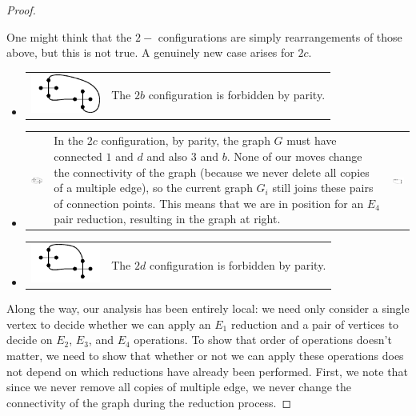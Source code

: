 \documentclass[amsmath,secnumarabic,floatfix,amssymb,nofootinbib,nobibnotes,letterpaper,11pt,tightenlines,showkeys]{revtex4}
\theoremstyle{definition}
\newcommand{\loopinsert}{E_1}
\newcommand{\edgedouble}{E_2}
\newcommand{\cutedgedouble}{E_3}
\newcommand{\pairinsert}{E_4}
\begin{document}
\begin{proof}
\begin{itemize}
\end{itemize}
One might think that the $2-$ configurations are simply rearrangements of those above, but this is not true. A genuinely new case arises for $2c$.
\begin{itemize}
\item 
\begin{tabular}{m{1in}m{3in}}
\includegraphics[width=0.9in]{2-b-configuration}
&
The $2b$ configuration is forbidden by parity.
\end{tabular}
\item 
\begin{tabular}{m{1in}m{3in}m{1in}}
\includegraphics[width=1in]{2-c-configuration}
&
In the $2c$ configuration, by parity, the graph $G$ must have connected $1$ and $d$ and also $3$ and $b$. None of our moves change the connectivity of the graph (because we never delete all copies of a multiple edge), so the current graph $G_i$ still joins these pairs of connection points. This means that we are in position for an $\pairinsert$ pair reduction, resulting in the graph at right.
&
\includegraphics[width=1in]{2-c-target}
\end{tabular}
\item 
\begin{tabular}{m{1in}m{3in}}
\includegraphics[width=0.9in]{2-d-configuration}
&
The $2d$ configuration is forbidden by parity.
\end{tabular}
\end{itemize}
Along the way, our analysis has been entirely local: we need only consider a single vertex to decide whether we can apply an $\loopinsert$ reduction and a pair of vertices to decide on $\edgedouble$, $\cutedgedouble$, and $\pairinsert$ operations. To show that order of operations doesn't matter, we need to show that whether or not we can apply these operations does not depend on which reductions have already been performed. First, we note that since we never remove all copies of multiple edge, we never change the connectivity of the graph during the reduction process.


\end{proof}
\end{document}
